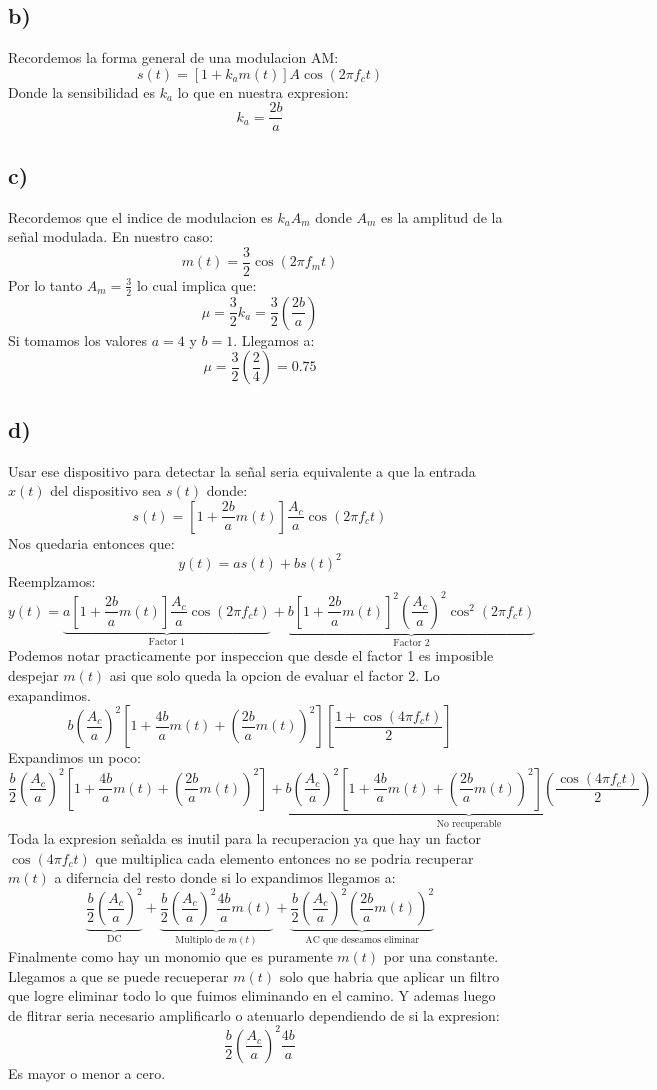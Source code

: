 \documentclass{article}
\begin{document}
\subsection*{b)}
Recordemos la forma general de una modulacion AM:
\[
s(t) = \left[1+k_am(t)\right]A\cos(2\pi f_c t)
\]
Donde la sensibilidad es \(k_a\) lo que en nuestra expresion:
\[
k_a = \frac{2b}{a}
\]
\subsection*{c)}
Recordemos que el indice de modulacion es \(k_aA_m\) donde \(A_m\) es la amplitud de la señal modulada. En nuestro caso:
\[
m(t)= \frac{3}{2}\cos(2\pi f_m t)
\]
Por lo tanto \(A_m = \frac{3}{2}\) lo cual implica que:
\[
\mu = \frac{3}{2}k_a = \frac{3}{2}\left(\frac{2b}{a}\right)
\]
Si tomamos los valores \(a= 4\) y \(b= 1\). Llegamos a:
\[
\mu = \frac{3}{2}\left(\frac{2}{4}\right) = 0.75
\]
\subsection*{d)}
Usar ese dispositivo para detectar la señal seria equivalente a que la entrada \(x(t)\) del dispositivo sea \(s(t)\) donde:
\[
s(t) = \left[1+\frac{2b}{a}m(t)\right]\frac{A_c}{a}\cos(2\pi f_c t)
\]
Nos quedaria entonces que:
\[
y(t)= a s(t)+b s(t)^{2}
\]
Reemplzamos:
\[
y(t)= \underbrace{a\left[1+\frac{2b}{a}m(t)\right]\frac{A_c}{a}\cos(2\pi f_c t)}_{\text{Factor 1}} + \underbrace{b\left[1+\frac{2b}{a}m(t)\right]^2\left(\frac{A_c}{a}\right)^2\cos^2(2\pi f_c t)}_{\text{Factor 2}}
\]
Podemos notar practicamente por inspeccion que desde el factor 1 es imposible despejar \(m(t)\) asi que solo queda la opcion de evaluar el factor 2. Lo exapandimos.
\[
b\left(\frac{A_c}{a}\right)^2\left[1+\frac{4b}{a}m(t)+\left(\frac{2b}{a}m(t)\right)^2\right]\left[\frac{1+\cos(4\pi f_c t)}{2}\right]
\]
Expandimos un poco:
\[
\frac{b}{2}\left(\frac{A_c}{a}\right)^2\left[1+\frac{4b}{a}m(t)+\left(\frac{2b}{a}m(t)\right)^2\right]+\underbrace{b\left(\frac{A_c}{a}\right)^2\left[1+\frac{4b}{a}m(t)+\left(\frac{2b}{a}m(t)\right)^2\right]\left(\frac{\cos(4\pi f_c t)}{2}\right)}_{\text{No recuperable}}
\]
Toda la expresion señalda es inutil para la recuperacion ya que hay un factor \(\cos(4\pi f_c t)\) que multiplica cada elemento entonces no se podria recuperar \(m(t)\) a diferncia del resto donde si lo expandimos llegamos a:
\[
\underbrace{\frac{b}{2}\left(\frac{A_c}{a}\right)^2}_{\text{DC}}+ \underbrace{\frac{b}{2}\left(\frac{A_c}{a}\right)^2\frac{4b}{a}m(t)}_{\text{Multiplo de }m(t)}+\underbrace{\frac{b}{2}\left(\frac{A_c}{a}\right)^2\left(\frac{2b}{a}m(t)\right)^2}_{\text{AC que deseamos eliminar}}
\]
Finalmente como hay un monomio que es puramente \(m(t)\) por una constante. Llegamos a que se puede recueperar \(m(t)\) solo que habria que aplicar un filtro que logre eliminar todo lo que fuimos eliminando en el camino. Y ademas luego de flitrar seria necesario amplificarlo o atenuarlo dependiendo de si la expresion:
\[
\frac{b}{2}\left(\frac{A_c}{a}\right)^2\frac{4b}{a}
\]
Es mayor o menor a cero. 
\end{document}
